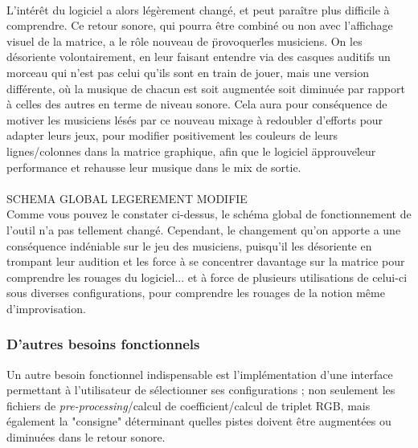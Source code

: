 \paragraph{}
L'intérêt du logiciel a alors légèrement changé, et peut paraître plus
difficile à comprendre. Ce retour sonore, qui pourra être combiné ou
non avec l'affichage visuel de la matrice, a le rôle nouveau de
\"provoquer\" les musiciens. On les désoriente volontairement, en leur
faisant entendre via des casques auditifs un morceau qui n'est pas
celui qu'ils sont en train de jouer, mais une version différente, où
la musique de chacun est soit augmentée soit diminuée par rapport à
celles des autres en terme de niveau sonore. Cela aura pour
conséquence de motiver les musiciens lésés par ce nouveau mixage à
redoubler d'efforts pour adapter leurs jeux, pour modifier
positivement les couleurs de leurs lignes/colonnes dans la matrice
graphique, afin que le logiciel \"approuve\" leur performance et
rehausse leur musique dans le mix de sortie. \\
\\
SCHEMA GLOBAL LEGEREMENT MODIFIE
\\
Comme vous pouvez le constater ci-dessus, le schéma global de
fonctionnement de l'outil n'a pas tellement changé. Cependant, le
changement qu'on apporte a une conséquence indéniable sur le jeu des
musiciens, puisqu'il les désoriente en trompant leur audition et les
force à se concentrer davantage sur la matrice pour comprendre les
rouages du logiciel... et à force de plusieurs utilisations de
celui-ci sous diverses configurations, pour comprendre les rouages de
la notion même d'improvisation. \\

\subsubsection{D'autres besoins fonctionnels}
Un autre besoin fonctionnel indispensable est l'implémentation d'une
interface permettant à l'utilisateur de sélectionner ses
configurations ; non seulement les fichiers de
\textit{pre-processing}/calcul de coefficient/calcul de triplet RGB,
mais également la "consigne" déterminant quelles pistes doivent être
augmentées ou diminuées dans le retour sonore. \\

